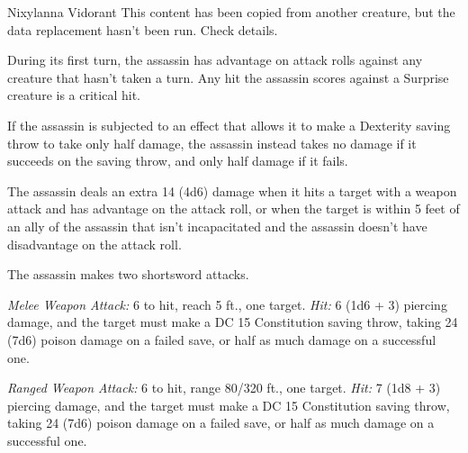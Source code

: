 \documentclass[10pt,a4paper,twoside,bg=print,twocolumn,openany,nodeprecatedcode]{dndbook}
\begin{document}
\begin{DndMonster}[float=t]{Nixylanna Vidorant}
\DndMonsterBasics[
armor-class = {15 (studded leather armor)},
hit-points = {\DndDice{12d8 + 24}},
speed = {30 ft.}
]
\DndMonsterAbilityScores[
 str = 11,
 dex = 16,
 con = 14,
 int = 13,
 wis = 11,
 cha = 10
]
\DndMonsterDetails[
saving-throws = {Dex +6, Int +4},
skills = {Acrobatics +6, Deception +3, Perception +3, Stealth +9},
damage-resistances = {poison},
languages = {Thieves' cant plus any two languages},
challenge = 8,
]
This content has been copied from another creature, but the data replacement hasn't been run. Check details.

During its first turn, the assassin has advantage on attack rolls against any creature that hasn't taken a turn. Any hit the assassin scores against a Surprise creature is a critical hit.

If the assassin is subjected to an effect that allows it to make a Dexterity saving throw to take only half damage, the assassin instead takes no damage if it succeeds on the saving throw, and only half damage if it fails.

The assassin deals an extra 14 (4d6) damage when it hits a target with a weapon attack and has advantage on the attack roll, or when the target is within 5 feet of an ally of the assassin that isn't incapacitated and the assassin doesn't have disadvantage on the attack roll.

The assassin makes two shortsword attacks.

\textsl{Melee Weapon Attack:} 6 to hit, reach 5 ft., one target. \textsl{Hit:} 6 (1d6 + 3) piercing damage, and the target must make a DC 15 Constitution saving throw, taking 24 (7d6) poison damage on a failed save, or half as much damage on a successful one.

\textsl{Ranged Weapon Attack:} 6 to hit, range 80/320 ft., one target. \textsl{Hit:} 7 (1d8 + 3) piercing damage, and the target must make a DC 15 Constitution saving throw, taking 24 (7d6) poison damage on a failed save, or half as much damage on a successful one.

\end{DndMonster}
\end{document}
